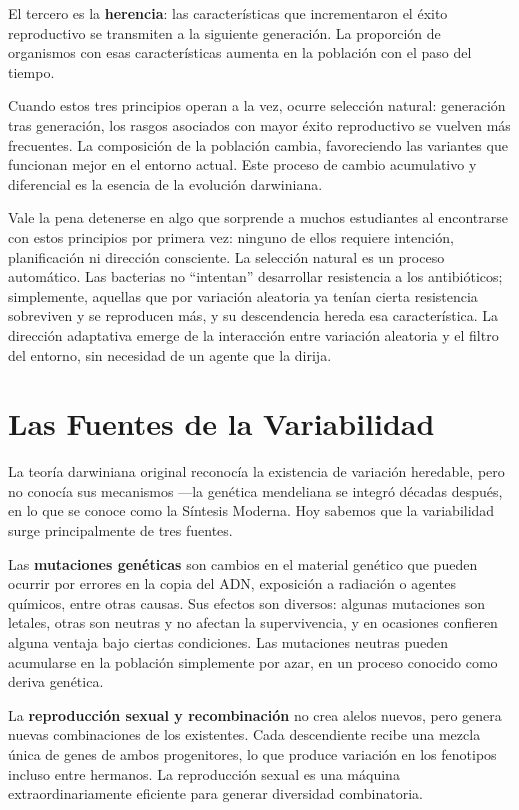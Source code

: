 \documentclass[
  letterpaper,
  DIV=11,
  numbers=noendperiod]{scrreprt}
\begin{document}
El tercero es la \textbf{herencia}: las características que
incrementaron el éxito reproductivo se transmiten a la siguiente
generación. La proporción de organismos con esas características aumenta
en la población con el paso del tiempo.

Cuando estos tres principios operan a la vez, ocurre selección natural:
generación tras generación, los rasgos asociados con mayor éxito
reproductivo se vuelven más frecuentes. La composición de la población
cambia, favoreciendo las variantes que funcionan mejor en el entorno
actual. Este proceso de cambio acumulativo y diferencial es la esencia
de la evolución darwiniana.

Vale la pena detenerse en algo que sorprende a muchos estudiantes al
encontrarse con estos principios por primera vez: ninguno de ellos
requiere intención, planificación ni dirección consciente. La selección
natural es un proceso automático. Las bacterias no ``intentan''
desarrollar resistencia a los antibióticos; simplemente, aquellas que
por variación aleatoria ya tenían cierta resistencia sobreviven y se
reproducen más, y su descendencia hereda esa característica. La
dirección adaptativa emerge de la interacción entre variación aleatoria
y el filtro del entorno, sin necesidad de un agente que la dirija.

\section{Las Fuentes de la
Variabilidad}\label{las-fuentes-de-la-variabilidad}

La teoría darwiniana original reconocía la existencia de variación
heredable, pero no conocía sus mecanismos ---la genética mendeliana se
integró décadas después, en lo que se conoce como la Síntesis Moderna.
Hoy sabemos que la variabilidad surge principalmente de tres fuentes.

Las \textbf{mutaciones genéticas} son cambios en el material genético
que pueden ocurrir por errores en la copia del ADN, exposición a
radiación o agentes químicos, entre otras causas. Sus efectos son
diversos: algunas mutaciones son letales, otras son neutras y no afectan
la supervivencia, y en ocasiones confieren alguna ventaja bajo ciertas
condiciones. Las mutaciones neutras pueden acumularse en la población
simplemente por azar, en un proceso conocido como deriva genética.

La \textbf{reproducción sexual y recombinación} no crea alelos nuevos,
pero genera nuevas combinaciones de los existentes. Cada descendiente
recibe una mezcla única de genes de ambos progenitores, lo que produce
variación en los fenotipos incluso entre hermanos. La reproducción
sexual es una máquina extraordinariamente eficiente para generar
diversidad combinatoria.
\end{document}
